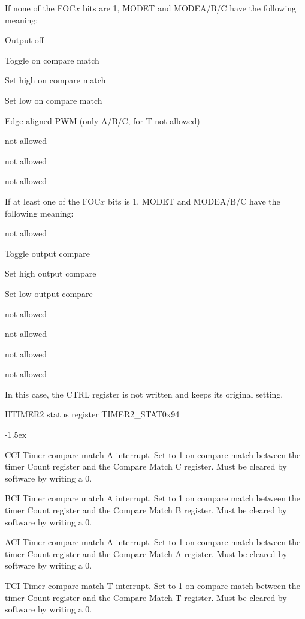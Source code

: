 \documentclass[12pt]{article}
\begin{document}
If none of the FOC$x$ bits are 1, MODET and MODEA/B/C have the following meaning:
\begin{description}\itemsep-7pt
\item[000] Output off
\item[001] Toggle on compare match
\item[010] Set high on compare match
\item[011] Set low on compare match
\item[100] Edge-aligned PWM (only A/B/C, for T not allowed)
\item[101] not allowed
\item[110] not allowed
\item[111] not allowed
\end{description}
If at least one of the FOC$x$ bits is 1, MODET and MODEA/B/C have the following meaning:
\begin{description}\itemsep-7pt
\item[000] not allowed
\item[001] Toggle output compare
\item[010] Set high output compare
\item[011] Set low output compare
\item[100] not allowed
\item[101] not allowed
\item[110] not allowed
\item[111] not allowed
\end{description}
In this case, the CTRL register is not written and keeps its original setting.

\begin{register}{H}{TIMER2 status register TIMER2\_STAT}{0x94}
\label{timer2stat}
%
%
%
%
%
%
\regnewline%
\end{register}
\begin{regdesc}[0.8\textwidth]\begin{reglist}[0000]
\itemsep-1.5ex
\item[CCI] Timer compare match A interrupt. Set to 1 on compare match between the timer Count register and the Compare Match C register. Must be cleared by software by writing a 0.
\item[BCI] Timer compare match A interrupt. Set to 1 on compare match between the timer Count register and the Compare Match B register. Must be cleared by software by writing a 0.
\item[ACI] Timer compare match A interrupt. Set to 1 on compare match between the timer Count register and the Compare Match A register. Must be cleared by software by writing a 0.
\item[TCI] Timer compare match T interrupt. Set to 1 on compare match between the timer Count register and the Compare Match T register. Must be cleared by software by writing a 0.
\end{reglist}\end{regdesc}
\end{document}
